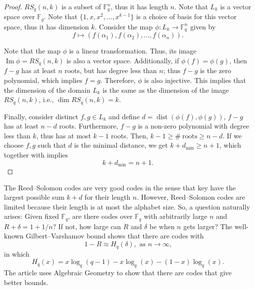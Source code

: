 \documentclass[11pt, oneside]{amsart}
\theoremstyle{definition}
\theoremstyle{remark}
\numberwithin{equation}{section}
\DeclareMathOperator{\dist}{dist}
\DeclareMathOperator{\Ima}{Im}
\DeclareMathOperator{\dimension}{dim}
\begin{document}
\begin{proof}
	$RS_q(n, k)$ is a subset of $\mathbb{F}_q^n$, thus it has length $n$.  
	Note that $ L_k$ is a vector space over $\mathbb{F}_q$.
	Note that $\{1, x, x^2, \dots, x^{k-1}\}$ is a choice of basis for this vector space, thus it has dimension $k$.
	Consider the map $\phi:  L_k \to \mathbb{F}_q^n$ given by 
	\begin{equation}
		f \mapsto (f(\alpha_1), f(\alpha_2), \dots, f(\alpha_n)).
	\end{equation}

	Note that the map $\phi$ is a linear transformation.
	Thus, its image $\Ima \phi = RS_q(n, k)$ is also a vector space.  
	Additionally, if $\phi(f) = \phi(g)$, then $f - g$ has at least $n$ roots, but has degree less than $n$; thus $f - g$ is the zero polynomial, which implies $f = g$.
	Therefore, $\phi$ is also injective.
	This implies that the dimension of the domain $ L_k$ is the same as the dimension of the image $RS_q(n, k)$, i.e.,  $\dimension RS_q(n, k) = k$.
	
	Finally, consider distinct $f, g \in  L_k$ and define $d = \dist(\phi(f), \phi(g))$, $f - g$ has at least $n - d$ roots.
	Furthermore, $f - g$ is a non-zero polynomial with degree less than $k$, thus has at most $k - 1$ roots.
	Then,  $ k - 1 \ge \#\ \text{roots} \ge n - d$.
	If we choose $f, g$ such that $d$ is the minimal distance, we get $k + d_{\mathrm{min}} \ge n + 1$, which together with  implies 
	\begin{equation}
		k + d_\text{min} = n + 1.
	\end{equation}

\end{proof}

The Reed--Solomon codes are very good codes in the sense that key have the largest possible sum $k + d$ for their length $n$.
However, Reed--Solomon codes are limited because their length is at most the alphabet size.
So, a question naturally arises: Given fixed $\mathbb{F}_q$, are there codes over $\mathbb{F}_q$ with arbitrarily large $n$ and $R + \delta = 1 + 1/n$?
If not, how large can $R$ and $\delta$ be when $n$ gets larger?
The well-known Gilbert--Varshamov bound shows that there are codes with 
\begin{equation}
	1 - R \approx H_q(\delta), \text{ as $n \to \infty$,}
\end{equation}
in which
\begin{equation}
	H_q(x) = x \log_q(q-1) - x\log_q(x) - (1-x)\log_q(x).
\end{equation}
The article \cite{TVZ82} uses Algebraic Geometry to show that there are codes that give better bounds.
\end{document}
